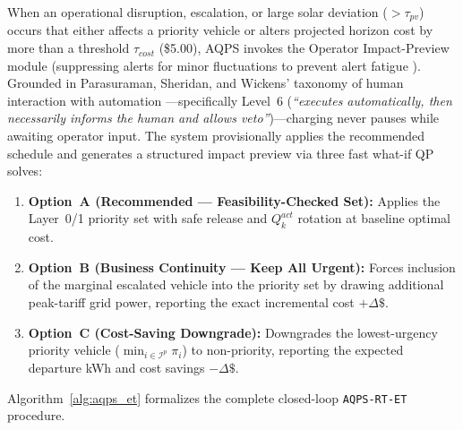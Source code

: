 \documentclass[final,3p,times,twocolumn]{elsarticle}
\begin{document}
When an operational disruption, escalation, or large solar deviation ($> \tau_{pv}$) occurs that either affects a priority vehicle or alters projected horizon cost by more than a threshold $\tau_{cost}$ (\$5.00), AQPS invokes the Operator Impact-Preview module (suppressing alerts for minor fluctuations to prevent alert fatigue \cite{parasuraman2010complacency}). Grounded in Parasuraman, Sheridan, and Wickens' taxonomy of human interaction with automation \cite{parasuraman2000model}---specifically Level~6 (\textit{``executes automatically, then necessarily informs the human and allows veto''})---charging never pauses while awaiting operator input. The system provisionally applies the recommended schedule and generates a structured impact preview via three fast what-if QP solves:
\begin{enumerate}
    \item \textbf{Option~A (Recommended --- Feasibility-Checked Set):} Applies the Layer~0/1 priority set with safe release and $Q_k^{act}$ rotation at baseline optimal cost.
    \item \textbf{Option~B (Business Continuity --- Keep All Urgent):} Forces inclusion of the marginal escalated vehicle into the priority set by drawing additional peak-tariff grid power, reporting the exact incremental cost $+\Delta\$$.
    \item \textbf{Option~C (Cost-Saving Downgrade):} Downgrades the lowest-urgency priority vehicle ($\min_{i \in \mathcal{I}^p} \pi_i$) to non-priority, reporting the expected departure kWh and cost savings $-\Delta\$$.
\end{enumerate}

Algorithm~\ref{alg:aqps_et} formalizes the complete closed-loop \texttt{AQPS-RT-ET} procedure.
\end{document}
